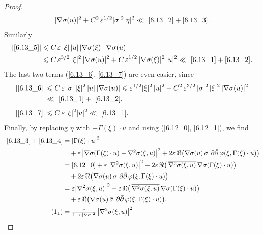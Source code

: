 \documentclass[AHL,Unicode,longabstracts,published]{cedram}
\DeclareMathOperator{\ddbar}{\partial\bar\partial}
\DeclarePairedDelimiter{\abs}{\lvert}{\rvert}
\let\leq\leqslant
\begin{document}
\begin{proof}
\begin{align*}
\abs{\nabla\sigma(u)}^2 + C^2\,\varepsilon^{1/2}
\abs{\sigma}^2
\abs{\eta}^2
\ll~\eqref{6.13_2}+\eqref{6.13_3}.
\end{align*}
Similarly
\begin{align*}
\abs*{\eqref{6.13_5}} &\leq C\,\varepsilon\, \abs{\xi}\,\abs{u}\,\abs{\nabla\sigma(\xi)}\,\abs{\nabla\sigma(u)}
\\
&\leq C\,\varepsilon^{3/2}\,\abs{\xi}^2\,\abs{\nabla\sigma(u)}^2 +C\,\varepsilon^{1/2}\,\abs{\nabla\sigma(\xi)}^2\,\abs{u}^2
\ll~\eqref{6.13_1}+\eqref{6.13_2}.
\end{align*}
The last two terms (\eqref{6.13_6}, \eqref{6.13_7}) are even easier, since
\begin{align*}
\abs*{\eqref{6.13_6}} &\leq C\,\varepsilon\,\abs{\sigma}\,\abs{\xi}^2\,\abs{u}\,\abs{\nabla\sigma(u)}
\leq \varepsilon^{1/2}\abs{\xi}^2\,\abs{u}^2+ C^2\,\varepsilon^{3/2}\,\abs{\sigma}^2\,\abs{\xi}^2\,\abs{\nabla\sigma(u)}^2
\\
&\ll~\eqref{6.13_1} +~\eqref{6.13_2},
\\[4pt]
\abs*{\eqref{6.13_7}} &\leq C\,\varepsilon\,\abs{\xi}^2\abs{u}^2
\ll~\eqref{6.13_1}.
\end{align*}
Finally, by replacing $\eta$ with $-\Gamma(\xi)\cdot u$ and using (\eqref{6.12_0}, \eqref{6.12_1}), we find
\begin{align}
\nonumber\stepcounter{equation}~\eqref{6.13_3}+\eqref{6.13_4} &=
\abs*{\Gamma(\xi)\cdot u}^2\\ &\quad{}+\varepsilon\,
\big|\nabla\sigma(\Gamma(\xi)\,{\cdot}\,u) -\nabla^2\sigma(\xi,u)\big|^2 +2\varepsilon\,\Re\big(
\nabla\sigma(u)\,\bar\sigma\,
\ddbar\varphi(\xi,\Gamma(\xi)\cdot u)\big)\\ &=\eqref{6.12_0}+\varepsilon\,\big|
\nabla^2\sigma(\xi,u)\big|^2-2\varepsilon\,\Re\big(
\,\overline{\nabla^2\sigma(\xi,u)}\,
\nabla\sigma(\Gamma(\xi)\cdot u)\big)\\ &\quad{}+2\varepsilon\,\Re\big(
\nabla\sigma(u)\,\bar\sigma\,
\ddbar\varphi(\xi,\Gamma(\xi)\cdot u)\big)\\ &=
\varepsilon
\abs*{\nabla^2\sigma(\xi,u)}^2 -\varepsilon\,\Re\big(\,
\overline{\nabla^2\sigma(\xi,u)}\,
\nabla\sigma(\Gamma(\xi)\cdot u)\big)\\ &\quad{}+\varepsilon\,\Re\big(
\nabla\sigma(u)\,\bar\sigma\,
\ddbar\varphi(\xi,\Gamma(\xi)\cdot u)\big).\\
\tag{$\theequation_1$}\label{6.14_1}
&=\tfrac{\varepsilon}{ 1+\varepsilon\abs{\nabla\sigma}^2}\,
\abs*{\nabla^2\sigma(\xi,u)}^2
\\

\end{align}
\end{proof}
\end{document}
